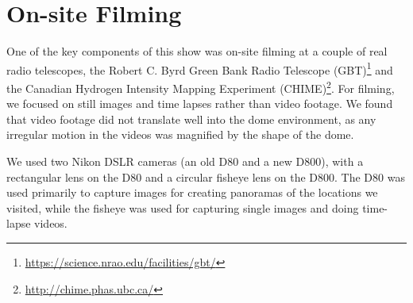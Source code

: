 \section{On-site Filming}

One of the key components of this show was on-site filming at a couple of real radio telescopes, the Robert C. Byrd Green Bank Radio Telescope (GBT)\footnote{\url{https://science.nrao.edu/facilities/gbt/}} and the Canadian Hydrogen Intensity Mapping Experiment (CHIME)\footnote{\url{http://chime.phas.ubc.ca/}}. For filming, we focused on still images and time lapses rather than video footage. We found that video footage did not translate well into the dome environment, as any irregular motion in the videos was magnified by the shape of the dome.  

We used two Nikon DSLR cameras (an old D80 and a new D800), with a rectangular lens on the D80 and a circular fisheye lens on the D800. The D80 was used primarily to capture images for creating panoramas of the locations we visited, while the fisheye was used for capturing single images and doing time-lapse videos. 

